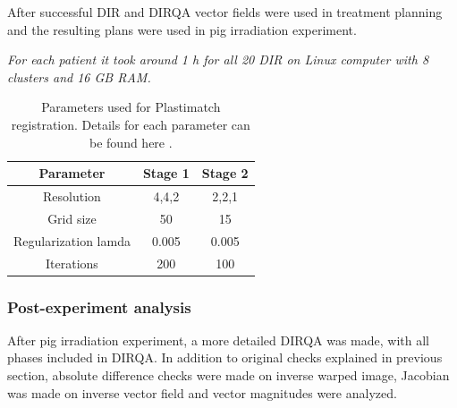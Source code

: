 \documentclass[type=dr, dr=rernat, accentcolor=tud7b,colorbacktitle, bigchapter, openright, twoside, 12pt ]{tudthesis}
\begin{document}
After successful DIR and DIRQA vector fields were used in treatment planning and the resulting plans were used in pig irradiation experiment.

\textit{For each patient it took around 1 h for all 20 DIR on Linux computer with 8 clusters and 16 GB RAM.}

\begin{table}[H]
  \centering
  \caption{Parameters used for Plastimatch registration. Details for each parameter can be found here \cite{Plastimatch}.}
  \begin{tabular}{c|c|c}
      Parameter & Stage 1 & Stage 2 \\
      \hline
      Resolution & 4,4,2 & 2,2,1 \\
      Grid size & 50 & 15 \\
      Regularization lamda & 0.005 & 0.005 \\
      Iterations & 200 & 100 \\
    \hline\hline
  \end{tabular}
  \label{tab:stages2}
\end{table}

\subsubsection{Post-experiment analysis}

After pig irradiation experiment, a more detailed DIRQA was made, with all phases included in DIRQA. In addition to original checks explained in previous section, absolute difference checks were made on inverse warped image, 
Jacobian was made on inverse vector field and vector magnitudes were analyzed.
\end{document}
